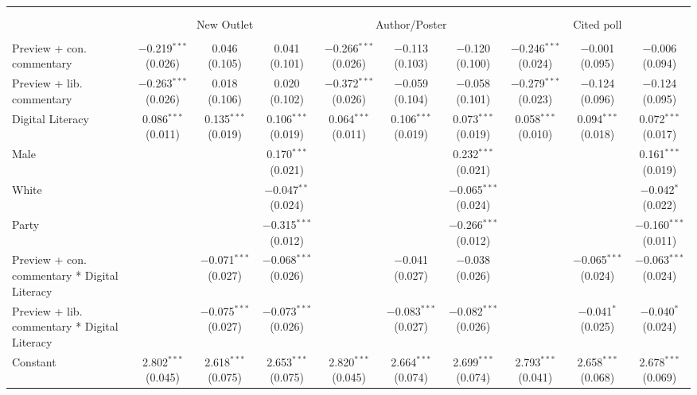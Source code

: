 
\begin{table}[!htbp] \centering 
  \caption{} 
  \label{} 
\begin{tabular}{@{\extracolsep{5pt}}lccccccccc} 
\\[-1.8ex]\hline 
\hline \\[-1.8ex] 
\\[-1.8ex] & \multicolumn{3}{c}{New Outlet} & \multicolumn{3}{c}{Author/Poster} & \multicolumn{3}{c}{Cited poll} \\ 
\hline \\[-1.8ex] 
 Preview + con. commentary & $-$0.219$^{***}$ (0.026) & 0.046 (0.105) & 0.041 (0.101) & $-$0.266$^{***}$ (0.026) & $-$0.113 (0.103) & $-$0.120 (0.100) & $-$0.246$^{***}$ (0.024) & $-$0.001 (0.095) & $-$0.006 (0.094) \\ 
  Preview + lib. commentary & $-$0.263$^{***}$ (0.026) & 0.018 (0.106) & 0.020 (0.102) & $-$0.372$^{***}$ (0.026) & $-$0.059 (0.104) & $-$0.058 (0.101) & $-$0.279$^{***}$ (0.023) & $-$0.124 (0.096) & $-$0.124 (0.095) \\ 
  Digital Literacy & 0.086$^{***}$ (0.011) & 0.135$^{***}$ (0.019) & 0.106$^{***}$ (0.019) & 0.064$^{***}$ (0.011) & 0.106$^{***}$ (0.019) & 0.073$^{***}$ (0.019) & 0.058$^{***}$ (0.010) & 0.094$^{***}$ (0.018) & 0.072$^{***}$ (0.017) \\ 
  Male &  &  & 0.170$^{***}$ (0.021) &  &  & 0.232$^{***}$ (0.021) &  &  & 0.161$^{***}$ (0.019) \\ 
  White &  &  & $-$0.047$^{**}$ (0.024) &  &  & $-$0.065$^{***}$ (0.024) &  &  & $-$0.042$^{*}$ (0.022) \\ 
  Party &  &  & $-$0.315$^{***}$ (0.012) &  &  & $-$0.266$^{***}$ (0.012) &  &  & $-$0.160$^{***}$ (0.011) \\ 
  Preview + con. commentary * Digital Literacy &  & $-$0.071$^{***}$ (0.027) & $-$0.068$^{***}$ (0.026) &  & $-$0.041 (0.027) & $-$0.038 (0.026) &  & $-$0.065$^{***}$ (0.024) & $-$0.063$^{***}$ (0.024) \\ 
  Preview + lib. commentary * Digital Literacy &  & $-$0.075$^{***}$ (0.027) & $-$0.073$^{***}$ (0.026) &  & $-$0.083$^{***}$ (0.027) & $-$0.082$^{***}$ (0.026) &  & $-$0.041$^{*}$ (0.025) & $-$0.040$^{*}$ (0.024) \\ 
  Constant & 2.802$^{***}$ (0.045) & 2.618$^{***}$ (0.075) & 2.653$^{***}$ (0.075) & 2.820$^{***}$ (0.045) & 2.664$^{***}$ (0.074) & 2.699$^{***}$ (0.074) & 2.793$^{***}$ (0.041) & 2.658$^{***}$ (0.068) & 2.678$^{***}$ (0.069) \\ 

\end{tabular}
\end{table}

